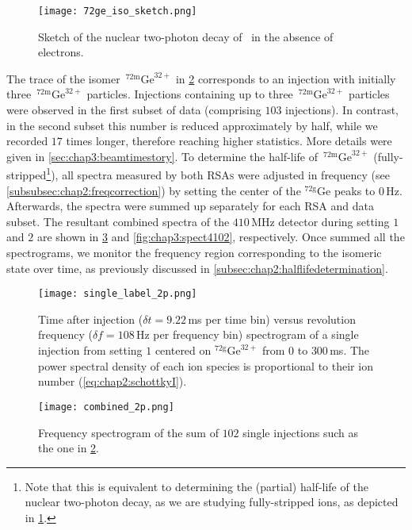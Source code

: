   \begin{figure}[hbt]
    \centering
    \texttt{[image: 72ge\_iso\_sketch.png]}
    \caption{Sketch of the nuclear two-photon decay of \, in the absence of electrons.}
    \label{fig:chap3:sketch72ge}
  \end{figure}

The trace of the isomer \,$^{72\mathrm{m}}\mathrm{Ge}^{32+}$ in \cref{fig:chap3:single} corresponds to an injection with initially three \,$^{72\mathrm{m}}\mathrm{Ge}^{32+}$ particles.
Injections containing up to three \,$^{72\mathrm{m}}\mathrm{Ge}^{32+}$ particles were observed in the first subset of data (comprising $103$ injections). In contrast, in the second subset this number is reduced approximately by half, while we recorded $17$ times longer, therefore reaching higher statistics. More details were given in \cref{sec:chap3:beamtimestory}.
\newpar
To determine the half-life of \,$^{72\mathrm{m}}\mathrm{Ge}^{32+}$ (fully-stripped\footnote{Note that this is equivalent to determining the (partial) half-life of the nuclear two-photon decay, as we are studying fully-stripped ions, as depicted in \cref{fig:chap3:sketch72ge}.}), all spectra measured by both \textsc{RSAs} were adjusted in frequency (see \cref{subsubsec:chap2:freqcorrection}) by setting the center of the $^{72\mathrm{g}}\mathrm{Ge}$ peaks to $0$\,Hz.
Afterwards, the spectra were summed up separately for each \textsc{RSA} and data subset.
The resultant combined spectra of the $410$\,MHz detector during setting $1$ and $2$ are shown in \cref{fig:chap3:combined} and \cref{fig:chap3:spect4102}, respectively.
Once summed all the spectrograms, we monitor the frequency region corresponding to the isomeric state over time, as previously discussed in \cref{subsec:chap2:halflifedetermination}.

\begin{figure}[hbt]
  \centering
  \texttt{[image: single\_label\_2p.png]}
  \caption{Time after injection ($\delta t=9.22$\,ms per time bin) versus revolution frequency ($\delta f=108$\,Hz per frequency bin) spectrogram of a single injection from setting $1$ centered on $^{72\mathrm{g}}\mathrm{Ge}^{32+}$ from $0$ to $300$\,ms. The power spectral density of each ion species is proportional to their ion number (\cref{eq:chap2:schottkyI}).}
  \label{fig:chap3:single}
\end{figure}

\begin{figure}[hbt]
  \centering
  \texttt{[image: combined\_2p.png]}
  \caption{Frequency spectrogram of the sum of $102$ single injections such as the one in \cref{fig:chap3:single}.}
  \label{fig:chap3:combined}
\end{figure}

